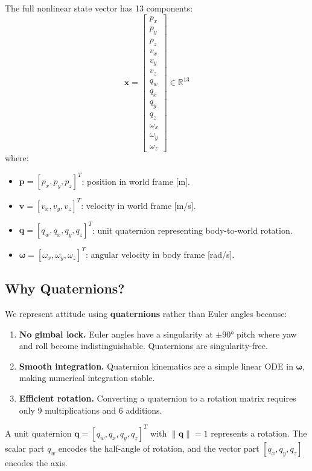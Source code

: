 \documentclass[12pt, a4paper]{article}
\newcommand{\R}{\mathbb{R}}
\newcommand{\bx}{\bm{x}}
\newcommand{\bq}{\bm{q}}
\newcommand{\bomega}{\bm{\omega}}
\begin{document}
The full nonlinear state vector has 13 components:
\begin{equation}
    \bx = \begin{bmatrix}
        p_x \\ p_y \\ p_z \\ v_x \\ v_y \\ v_z \\ q_w \\ q_x \\ q_y \\ q_z \\ \omega_x \\ \omega_y \\ \omega_z
    \end{bmatrix}
    \in \R^{13}
\end{equation}
where:
\begin{itemize}
    \item $\bm{p} = [p_x, p_y, p_z]^T$: position in world frame [m].
    \item $\bm{v} = [v_x, v_y, v_z]^T$: velocity in world frame [m/s].
    \item $\bq = [q_w, q_x, q_y, q_z]^T$: unit quaternion representing body-to-world rotation.
    \item $\bomega = [\omega_x, \omega_y, \omega_z]^T$: angular velocity in body frame [rad/s].
\end{itemize}

\subsection{Why Quaternions?}

We represent attitude using \textbf{quaternions} rather than Euler angles because:
\begin{enumerate}
    \item \textbf{No gimbal lock.}  Euler angles have a singularity at $\pm 90°$ pitch where yaw and roll become indistinguishable.  Quaternions are singularity-free.
    \item \textbf{Smooth integration.}  Quaternion kinematics are a simple linear ODE in $\bomega$, making numerical integration stable.
    \item \textbf{Efficient rotation.}  Converting a quaternion to a rotation matrix requires only 9 multiplications and 6 additions.
\end{enumerate}

A unit quaternion $\bq = [q_w, q_x, q_y, q_z]^T$ with $\|\bq\| = 1$ represents a rotation.  The scalar part $q_w$ encodes the half-angle of rotation, and the vector part $[q_x, q_y, q_z]$ encodes the axis.
\end{document}
